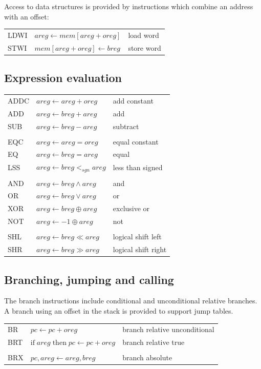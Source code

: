 \documentclass[a4paper, 12pt]{article}
\begin{document}
Access to data structures is provided by instructions which combine an
address with an offset:

\begin{tabular}{lll}
LDWI  & $areg \leftarrow mem[areg + oreg]$& load word  \\
STWI  & $mem[areg + oreg] \leftarrow breg$& store word   
\end{tabular}


\subsection*{Expression evaluation}

\begin{tabular}{lll}
ADDC & $ areg \leftarrow areg + oreg $ & add constant\\  
ADD & $ areg \leftarrow breg + areg $ & add \\  
SUB & $ areg  \leftarrow breg - areg $ & subtract \\  
&&\\
EQC & $ areg \leftarrow areg = oreg $ & equal constant \\  
EQ & $ areg \leftarrow breg = areg  $ & equal \\  
LSS & $ areg  \leftarrow breg  <_{sgn} areg $ & less than signed \\  
&&\\
AND & $ areg \leftarrow breg \wedge areg $ & and \\  
OR  & $ areg \leftarrow breg  \vee areg $ & or \\  
XOR & $ areg \leftarrow breg \oplus areg $& exclusive or \\
NOT & $ areg  \leftarrow -1 \oplus areg $& not\\
&&\\
SHL & $ areg \leftarrow breg \ll areg $ & logical shift left \\  
SHR & $ areg \leftarrow breg \gg areg $ & logical shift right  \\  
\end{tabular}


\subsection*{Branching, jumping and calling}

The branch instructions include conditional and unconditional relative 
branches. A branch using an offset in the stack is provided to 
support jump tables.

\begin{tabular}{lll}
BR   & $ pc \leftarrow pc + oreg $& branch relative unconditional \\
BRT & $\mathrm{if}\; areg \;\mathrm{then}\; pc \leftarrow pc + oreg $ &branch relative true\\
&&\\
BRX & $pc, areg \leftarrow areg, breg$ &branch absolute\\
\end{tabular}
\end{document}
